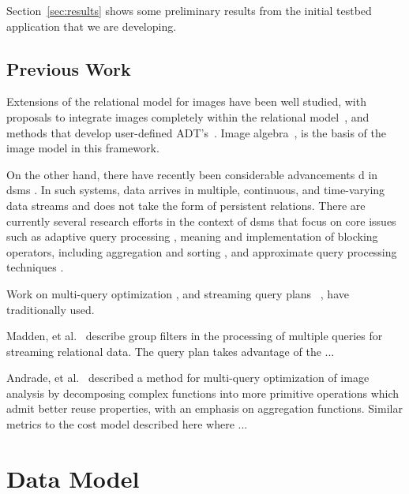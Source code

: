 \documentclass{vldb}
\begin{document}
Section~\ref{sec:results} shows some preliminary results from the
initial testbed application that we are developing.

\subsection{Previous Work}

Extensions of the relational model for images have been well studied,
with proposals to integrate images completely within the relational
model~\cite{pixel-one}, and methods that develop user-defined
ADT's~\cite{pixel-one, grid one}.  Image
algebra~\cite{wilson01handb-comput, ritter99image-algeb}, is the basis
of the image model in this framework.

On the other hand, there have recently been considerable advancements
d in \acl{dsms} \cite{babcoc02model-issues, carney02monit-stream,
  heller00adapt-query}. In such systems, data arrives in multiple,
continuous, and time-varying data streams and does not take the form
of persistent relations. There are currently several research efforts
in the context of \ac{dsms} that focus on core issues such as adaptive
query processing \cite{CDN2002a, madden02fjord-stream,
  madden02contin-adapt,SHC2003a}, meaning and implementation of
blocking operators, including aggregation and sorting
\cite{HH99a,LEH2002a}, and approximate query processing techniques
\cite{DGG2002a,GKS2001a}.


Work on multi-query optimization \cite{}, and streaming query plans
~\cite{},  have traditionally used.

Madden, et al.~\cite{madden99etc} describe group filters in the
processing of multiple queries for streaming relational data.  The
query plan takes advantage of the ...

Andrade, et al.~\cite{andrade02exploi-funct} described a method for
multi-query optimization of image analysis by decomposing complex
functions into more primitive operations which admit better reuse
properties, with an emphasis on aggregation functions.  Similar
metrics to the cost model described here where ...

\section{Data Model}
\label{sec:model}
\end{document}
